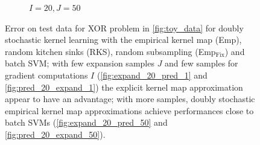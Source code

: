 \documentclass{article} %
\begin{document}
\begin{figure}[!ht]
\begin{subfigure}[b]{0.235\textwidth}
        \caption{$I=20, J=50$}
        \label{fig:pred_20_expand_50}
    \end{subfigure}
    \caption{\footnotesize Error on test data for XOR problem in \autoref{fig:toy_data} for doubly stochastic kernel learning with the empirical kernel map (Emp), random kitchen sinks (RKS), random subsampling (Emp$_{\text{Fix}}$) and batch SVM; with few expansion samples $J$ and few samples for gradient computations $I$ (\autoref{fig:expand_20_pred_1} and \autoref{fig:pred_20_expand_1}) the explicit kernel map approximation appear to have an advantage; with more samples, doubly stochastic empirical kernel map approximations achieve performances close to batch SVMs (\autoref{fig:expand_20_pred_50} and \autoref{fig:pred_20_expand_50}).}
    \label{fig:toydata_comparisons}
\end{figure}
%
\end{document}
